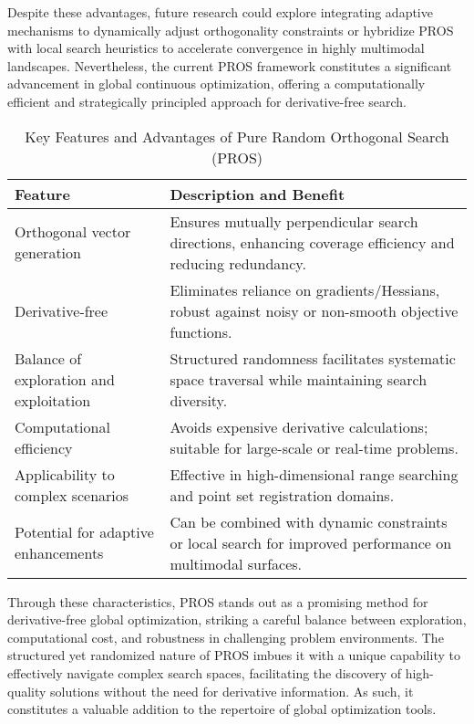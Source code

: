 \documentclass[sigconf]{acmart}
\begin{document}
Despite these advantages, future research could explore integrating adaptive mechanisms to dynamically adjust orthogonality constraints or hybridize PROS with local search heuristics to accelerate convergence in highly multimodal landscapes. Nevertheless, the current PROS framework constitutes a significant advancement in global continuous optimization, offering a computationally efficient and strategically principled approach for derivative-free search.

\begin{table*}[htbp]
\centering
\caption{Key Features and Advantages of Pure Random Orthogonal Search (PROS)}
\label{tab:pros_features}
\begin{adjustbox}{max width=\textwidth}
\begin{tabular}{ll}
\toprule
\textbf{Feature} & \textbf{Description and Benefit} \\
\toprule
Orthogonal vector generation & Ensures mutually perpendicular search directions, enhancing coverage efficiency and reducing redundancy. \\
Derivative-free & Eliminates reliance on gradients/Hessians, robust against noisy or non-smooth objective functions. \\
Balance of exploration and exploitation & Structured randomness facilitates systematic space traversal while maintaining search diversity. \\
Computational efficiency & Avoids expensive derivative calculations; suitable for large-scale or real-time problems. \\
Applicability to complex scenarios & Effective in high-dimensional range searching and point set registration domains. \\
Potential for adaptive enhancements & Can be combined with dynamic constraints or local search for improved performance on multimodal surfaces. \\
\bottomrule
\end{tabular}
\end{adjustbox}
\end{table*}

Through these characteristics, PROS stands out as a promising method for derivative-free global optimization, striking a careful balance between exploration, computational cost, and robustness in challenging problem environments. The structured yet randomized nature of PROS imbues it with a unique capability to effectively navigate complex search spaces, facilitating the discovery of high-quality solutions without the need for derivative information. As such, it constitutes a valuable addition to the repertoire of global optimization tools.
\end{document}
